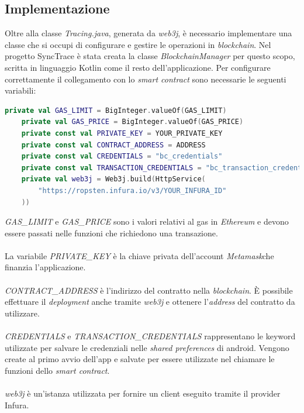 \subsection{Implementazione}
Oltre alla classe \textit{Tracing.java}, generata da \textit{web3j}, è necessario implementare una classe che si occupi di configurare e gestire le operazioni in \textit{blockchain}.
Nel progetto SyncTrace è stata creata la classe \textit{BlockchainManager} per questo scopo, scritta in linguaggio Kotlin come il resto dell'applicazione.
Per configurare correttamente il collegamento con lo \textit{smart contract} sono necessarie le seguenti variabili:
\begin{lstlisting}[language = Kotlin]
    private val GAS_LIMIT = BigInteger.valueOf(GAS_LIMIT)
    private val GAS_PRICE = BigInteger.valueOf(GAS_PRICE)
    private const val PRIVATE_KEY = YOUR_PRIVATE_KEY
    private const val CONTRACT_ADDRESS = ADDRESS
    private const val CREDENTIALS = "bc_credentials"
    private const val TRANSACTION_CREDENTIALS = "bc_transaction_credentials"
    private val web3j = Web3j.build(HttpService(
        "https://ropsten.infura.io/v3/YOUR_INFURA_ID"
    ))
\end{lstlisting}
\mbox{\\}

\textit{GAS\_LIMIT} e \textit{GAS\_PRICE} sono i valori relativi al gas in \textit{Ethereum} e devono essere passati nelle funzioni che richiedono una transazione.\\\\
La variabile \textit{PRIVATE\_KEY} è la chiave privata dell'account \emph{\gls{Metamask}}\glsfirstoccur che finanzia l'applicazione.\\\\
\textit{CONTRACT\_ADDRESS} è l'indirizzo del contratto nella \textit{blockchain}. È possibile effettuare il \textit{deployment} anche tramite \textit{web3j} e ottenere l'\textit{address} del contratto da utilizzare.\\\\
\textit{CREDENTIALS} e \textit{TRANSACTION\_CREDENTIALS} rappresentano le keyword utilizzate per salvare le credenziali nelle \textit{shared preferences} di android. Vengono create al primo avvio dell'app e salvate per essere utilizzate nel chiamare le funzioni dello \textit{smart contract}.\\\\ 
\textit{web3j} è un'istanza utilizzata per fornire un client eseguito tramite il provider Infura.\\\\

